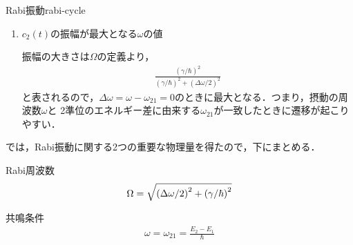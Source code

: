 \documentclass{report}
\begin{document}
\begin{myex}{Rabi振動}{rabi-cycle}
\begin{enumerate}
\begin{align}
        \end{align}
        となる．
        初期条件を考えると，
        \begin{align}
          \begin{dcases}
            A + B = 0 \\ 
            A - B = -\frac{\gamma}{\hbar\Omega}
          \end{dcases}
        \end{align}
        であるから，
        \begin{align}
          B = -A = \frac{\gamma}{2\hbar\Omega}
        \end{align}
        となる．よって，
        \begin{align}
          c_1(t) &= \exp\qty(-\i\frac{\Delta\omega}{2}t)\qty(\cos\Omega t - \i\frac{\Delta \omega}{2\Omega}\sin\Omega t) \\ 
          c_2(t) &=  - \i\frac{\gamma}{\hbar\Omega}\exp\qty(-\i\frac{\Delta\omega}{2}t)\sin\Omega t
        \end{align}
        である．時刻$t$で$\ket{1}$，$\ket{2}$に状態を見出す確率，$\abs{c_1(t)}^2$，$\abs{c_2(t)}^2$はそれぞれ，
        \begin{align}
          \abs{c_1(t)}^2 &= \cos^2\Omega t + \qty(\frac{\Delta \omega}{2})^2\frac{1}{\Omega^2}\sin^2\Omega t \\ 
          \abs{c_2(t)}^2 &= \frac{\gamma^2}{\hbar^2\Omega^2}\sin^2\Omega t
        \end{align}
        である．簡単な計算により，$\abs{c_1(t)}^2 + \abs{c_2(t)}^2 = 1$となることが容易に確かめられる．
      \item $c_2(t)$の振幅が最大となる$\omega$の値\par
        振幅の大きさは$\Omega$の定義より，
        \begin{align}
          \frac{(\gamma/\hbar)^2}{(\gamma/\hbar)^2 + (\Delta\omega/2)^2}
        \end{align}
        と表されるので，$\Delta\omega = \omega - \omega_{21} = 0$のときに最大となる．つまり，摂動の周波数$\omega$と
        2準位のエネルギー差に由来する$\omega_{21}$が一致したときに遷移が起こりやすい．
    \end{enumerate}
  \end{myex}
  では，Rabi振動に関する2つの重要な物理量を得たので，下にまとめる．
  \begin{itembox}[l]{Rabi周波数}
    \begin{align}
    \Omega = \sqrt{\qty(\Delta\omega/2)^2 + \qty(\gamma/\hbar)^2}   
    \end{align}
  \end{itembox}
  \begin{itembox}[l]{共鳴条件}
    \begin{align}
      \omega = \omega_{21} = \frac{E_2 - E_1}{\hbar}
    \end{align}
  \end{itembox}
\end{document}
